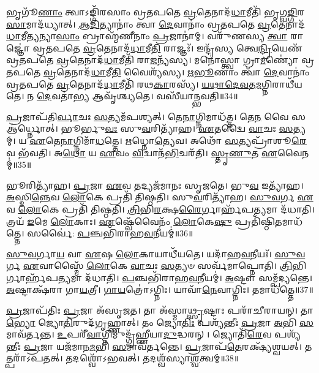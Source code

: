 𑌭𑍃𑌗𑍂᳴\-\ul{𑌣𑌾𑌂} 𑌤𑍍𑌵𑌾\-𑌽𑌙𑍍𑌗𑌿᳴𑌰𑌸𑌾𑌂 𑌵𑍍𑌰𑌤𑌪𑌤𑍇 \ul{𑌵𑍍𑌰}\-𑌤𑍇𑌨𑌾𑌦᳴\-\ul{𑌧𑌾}\-𑌮𑍀𑌤𑌿᳴ 𑌭𑍃𑌗𑍍𑌵\-\ul{𑌙𑍍𑌗𑌿}\-𑌰\-\ul{𑌸𑌾}\-\-𑌮𑌾𑌦᳴𑌧𑍍𑌯𑌾𑌤𑍍।
\-\ul{𑌆}\-\-\ul{𑌦𑌿}\-𑌤𑍍𑌯𑌾𑌨𑌾𑌂॑ 𑌤𑍍𑌵𑌾 \ul{𑌦𑍇}\-𑌵𑌾𑌨𑌾𑌂॑ 𑌵𑍍𑌰𑌤𑌪𑌤𑍇 \ul{𑌵𑍍𑌰}\-𑌤𑍇𑌨𑌾𑌦᳴\-\ul{𑌧𑌾}\-𑌮𑍀\-\-\ul{𑌤𑍍𑌯}\-𑌨𑍍𑌯𑌾\-\ul{𑌸𑌾𑌂} 𑌬𑍍𑌰𑌾𑌹𑍍𑌮᳴𑌣𑍀𑌨𑌾𑌂 \ul{𑌪𑍍𑌰}\-𑌜𑌾𑌨𑌾॑𑌮𑍍।
𑌵𑌰𑍁᳴𑌣𑌸𑍍𑌯 \ul{𑌤𑍍𑌵𑌾} 𑌰𑌾𑌜𑍍𑌞𑍋॑ 𑌵𑍍𑌰𑌤𑌪𑌤𑍇 \ul{𑌵𑍍𑌰}\-𑌤𑍇𑌨𑌾𑌦᳴\-\ul{𑌧𑌾}\-𑌮𑍀\-\ul{𑌤𑌿} 𑌰𑌾𑌜𑍍𑌞𑌃᳴।
𑌇𑌨𑍍𑌦𑍍𑌰᳴𑌸𑍍𑌯 𑌤𑍍𑌵𑍇\-\ul{𑌨𑍍𑌦𑍍𑌰𑌿}\-𑌯𑍇𑌣᳴ 𑌵𑍍𑌰𑌤𑌪𑌤𑍇 \ul{𑌵𑍍𑌰}\-𑌤𑍇𑌨𑌾𑌦᳴\-\ul{𑌧𑌾}\-𑌮𑍀𑌤𑌿᳴ 𑌰𑌾\-\ul{𑌜}\-𑌨𑍍𑌯᳴𑌸𑍍𑌯।
𑌮𑌨𑍋॑𑌸𑍍𑌤𑍍𑌵𑌾 𑌗𑍍𑌰𑌾\-\ul{𑌮}\-𑌣𑍍𑌯𑍋॑ 𑌵𑍍𑌰𑌤𑌪𑌤𑍇 \ul{𑌵𑍍𑌰}\-𑌤𑍇𑌨𑌾𑌦᳴\-\ul{𑌧𑌾}\-𑌮𑍀\-\ul{𑌤𑌿} 𑌵𑍈𑌶𑍍𑌯᳴𑌸𑍍𑌯।
\-\ul{𑌋}\-\-\ul{𑌭𑍂}\-𑌣𑌾𑌂 𑌤𑍍𑌵𑌾᳴ \ul{𑌦𑍇}\-𑌵𑌾𑌨𑌾𑌂॑ 𑌵𑍍𑌰𑌤𑌪𑌤𑍇 \ul{𑌵𑍍𑌰}\-𑌤𑍇𑌨𑌾𑌦᳴\-\ul{𑌧𑌾}\-𑌮𑍀𑌤𑌿᳴ 𑌰𑌥\-\ul{𑌕𑌾}\-𑌰𑌸𑍍𑌯᳴।
\-\ul{𑌯}\-\-\ul{𑌥𑌾}\-\-\ul{𑌦𑍇}\-\-\ul{𑌵}\-𑌤\-\ul{𑌮}\-𑌗𑍍𑌨𑌿𑌰𑌾𑌧𑍀᳴𑌯𑌤𑍇।
𑌨 \ul{𑌦𑍇}\-𑌵𑌤𑌾॑\-\ul{𑌭𑍍𑌯} 𑌆𑌵𑍃᳴𑌶𑍍𑌚𑍍𑌯𑌤𑍇।
𑌵𑌸𑍀᳴𑌯𑌾𑌨𑍍𑌭𑌵𑌤𑌿॥34॥\anuvakamend[\-\ul{𑌧𑍍𑌯𑌾}\-\-\ul{𑌯}\-\-\ul{𑌤𑌿} 𑌵𑍈 𑌰𑌾\-\ul{𑌤𑍍𑌰𑌿}\-𑌶𑍍𑌚𑌾𑌵᳴ 𑌰𑍁𑌨𑍍𑌧𑍇 𑌭𑌵𑌿\-\ul{𑌷𑍍𑌯}\-𑌨𑍍𑌤𑍀𑌤𑍍𑌯᳴𑌬𑍍𑌰𑌵𑍀𑌜𑍍𑌜\-\ul{𑌨𑌿}\-𑌷𑍍𑌯𑌸𑍇᳴\-𑌽𑌜\-\ul{𑌯}\-𑌦𑍍𑌵𑌸𑍀᳴𑌯𑌾𑌨𑍍𑌭𑌵\-\ul{𑌤𑌿} 𑌨𑌵᳴ 𑌚]

\-\ul{𑌪𑍍𑌰}\-𑌜𑌾𑌪᳴𑌤𑌿\-\ul{𑌰𑍍𑌵𑌾}\-𑌚𑌃 \ul{𑌸}\-𑌤𑍍𑌯𑌮᳴𑌪𑌶𑍍𑌯𑌤𑍍।
𑌤𑍇\-\ul{𑌨𑌾}\-𑌗𑍍𑌨𑌿𑌮𑌾𑌧᳴𑌤𑍍𑌤।
𑌤𑍇\-\ul{𑌨} 𑌵𑍈 𑌸 𑌆॑𑌰𑍍𑌧𑍍𑌨𑍋𑌤𑍍।
𑌭𑍂𑌰𑍍𑌭𑍁\-\ul{𑌵𑌃} 𑌸𑍁\-\ul{𑌵}\-𑌰𑌿𑌤𑍍𑌯𑌾᳴𑌹।
\-\ul{𑌏}\-𑌤𑌦𑍍𑌵𑍈 \ul{𑌵𑌾}\-𑌚𑌃 \ul{𑌸}\-𑌤𑍍𑌯𑌮𑍍।
𑌯 \ul{𑌏}\-𑌤𑍇\-\ul{𑌨𑌾}\-𑌗𑍍𑌨𑌿𑌮𑌾᳴\-\ul{𑌧}\-𑌤𑍍𑌤𑍇।
\-\ul{𑌋}\-𑌧𑍍𑌨𑍋\-\ul{𑌤𑍍𑌯𑍇}\-𑌵।
𑌅𑌥𑍋᳴ \ul{𑌸}\-𑌤𑍍𑌯𑌪𑍍𑌰𑌾᳴𑌶𑍂\-\ul{𑌰𑍇}\-𑌵 𑌭᳴𑌵𑌤𑌿।
𑌅\-\ul{𑌥𑍋} 𑌯 \ul{𑌏}\-𑌵𑌂 \ul{𑌵𑌿}\-𑌦𑍍𑌵𑌾𑌨᳴\-\ul{𑌭𑌿}\-𑌚𑌰᳴𑌤𑌿।
\-\ul{𑌸𑍍𑌤𑍃}\-\-\ul{𑌣𑍁}\-𑌤 \ul{𑌏}\-𑌵𑍈𑌨𑌮𑍍॑॥35॥

𑌭𑍂𑌰𑌿𑌤𑍍𑌯𑌾᳴𑌹।
\-\ul{𑌪𑍍𑌰}\-𑌜𑌾 \ul{𑌏}\-𑌵 𑌤𑌦𑍍𑌯𑌜᳴𑌮𑌾𑌨𑌃 𑌸𑍃𑌜𑌤𑍇।
𑌭𑍁\-\ul{𑌵} 𑌇𑌤𑍍𑌯𑌾᳴𑌹।
\-\ul{𑌅}\-𑌸𑍍𑌮𑌿\-\ul{𑌨𑍍𑌨𑍇}\-𑌵 \ul{𑌲𑍋}\-𑌕𑍇 𑌪𑍍𑌰𑌤𑌿᳴ 𑌤𑌿𑌷𑍍𑌠𑌤𑌿।
𑌸𑍁\-\ul{𑌵}\-𑌰𑌿𑌤𑍍𑌯𑌾᳴𑌹।
\-\ul{𑌸𑍁}\-\-\ul{𑌵}\-𑌰𑍍𑌗 \ul{𑌏}\-𑌵 \ul{𑌲𑍋}\-𑌕𑍇 𑌪𑍍𑌰𑌤𑌿᳴ 𑌤𑌿𑌷𑍍𑌠𑌤𑌿।
\-\ul{𑌤𑍍𑌰𑌿}\-𑌭𑌿\-\ul{𑌰}\-𑌕𑍍𑌷\-\ul{𑌰𑍈}\-𑌰𑍍𑌗𑌾𑌰𑍍\mbox{}𑌹᳴𑌪\-\ul{𑌤𑍍𑌯}\-𑌮𑌾 𑌦᳴𑌧𑌾𑌤𑌿।
𑌤𑍍𑌰𑌯᳴ \ul{𑌇}\-𑌮𑍇 \ul{𑌲𑍋}\-𑌕𑌾𑌃।
\-\ul{𑌏}\-𑌷𑍍𑌵𑍇᳴𑌵𑍈𑌨𑌂᳴ \ul{𑌲𑍋}\-𑌕𑍇\-\ul{𑌷𑍁} 𑌪𑍍𑌰𑌤𑌿᳴\-𑌷𑍍𑌠𑌿\-\ul{𑌤}\-𑌮𑌾𑌧᳴𑌤𑍍𑌤𑍇।
𑌸𑌰𑍍𑌵𑍈॑: \ul{𑌪}\-𑌞𑍍𑌚𑌭𑌿᳴𑌰𑌾𑌹\-\ul{𑌵}\-𑌨𑍀𑌯𑌮𑍍॑॥36॥

\-\ul{𑌸𑍁}\-\-\ul{𑌵}\-𑌰𑍍𑌗𑌾\-\ul{𑌯} 𑌵𑌾 \ul{𑌏}\-𑌷 \ul{𑌲𑍋}\-𑌕𑌾𑌯𑌾𑌧𑍀᳴𑌯𑌤𑍇।
𑌯𑌦𑌾᳴𑌹\-\ul{𑌵}\-𑌨𑍀𑌯𑌃᳴।
\-\ul{𑌸𑍁}\-\-\ul{𑌵}\-𑌰𑍍𑌗 \ul{𑌏}\-𑌵𑌾𑌸𑍍𑌮𑍈᳴ \ul{𑌲𑍋}\-𑌕𑍇 \ul{𑌵𑌾}\-𑌚𑌃 \ul{𑌸}\-𑌤𑍍𑌯𑍞 𑌸𑌰𑍍𑌵᳴𑌮𑌾𑌪𑍍𑌨𑍋𑌤𑌿।
\-\ul{𑌤𑍍𑌰𑌿}\-𑌭𑌿𑌰𑍍𑌗𑌾𑌰𑍍\mbox{}𑌹᳴𑌪\-\ul{𑌤𑍍𑌯}\-𑌮𑌾 𑌦᳴𑌧𑌾𑌤𑌿।
\-\ul{𑌪}\-𑌞𑍍𑌚𑌭𑌿᳴𑌰𑌾𑌹\-\ul{𑌵}\-𑌨𑍀𑌯𑌮𑍍॑।
\-\ul{𑌅}\-𑌷𑍍𑌟𑍗 𑌸𑌮𑍍𑌪᳴𑌦𑍍𑌯𑌨𑍍𑌤𑍇।
\-\ul{𑌅}\-𑌷𑍍𑌟𑌾𑌕𑍍𑌷᳴𑌰𑌾 𑌗𑌾\-\ul{𑌯}\-𑌤𑍍𑌰𑍀।
\-\ul{𑌗𑌾}\-\-\ul{𑌯}\-𑌤𑍍𑌰𑍋॑\-𑌽𑌗𑍍𑌨𑌿𑌃।
𑌯𑌾𑌵𑌾᳴\-\ul{𑌨𑍇}\-𑌵𑌾𑌗𑍍𑌨𑌿𑌃।
𑌤𑌮𑌾𑌧᳴𑌤𑍍𑌤𑍇॥37॥

\-\ul{𑌪𑍍𑌰}\-𑌜𑌾\-𑌪᳴𑌤𑌿𑌃 \ul{𑌪𑍍𑌰}\-𑌜𑌾 𑌅᳴\-𑌸𑍃𑌜𑌤।
𑌤𑌾 𑌅᳴𑌸𑍍𑌮𑌾\-\ul{𑌥𑍍𑌸𑍃}\-𑌷𑍍𑌟𑌾𑌃 𑌪𑌰𑌾᳴𑌚𑍀𑌰𑌾𑌯𑌨𑍍।
𑌤𑌾\-\ul{𑌭𑍍𑌯𑍋} 𑌜𑍍𑌯𑍋\-\ul{𑌤𑌿}\-𑌰𑍁𑌦᳴𑌗𑍃𑌹𑍍𑌣𑌾𑌤𑍍।
𑌤𑌂 𑌜𑍍𑌯𑍋\-\ul{𑌤𑌿𑌃} 𑌪𑌶𑍍𑌯᳴𑌨𑍍𑌤𑍀𑌃 \ul{𑌪𑍍𑌰}\-𑌜𑌾 \ul{𑌅}\-𑌭𑌿 \ul{𑌸}\-𑌮𑌾𑌵᳴𑌰𑍍𑌤𑌨𑍍𑌤।
\-\ul{𑌉}\-𑌪𑌰𑍀᳴\-\ul{𑌵𑌾}\-𑌗𑍍𑌨𑌿𑌮𑍁𑌦𑍍𑌗𑍃᳴𑌹𑍍𑌣𑍀𑌯𑌾\-\ul{𑌦𑍁}\-𑌦𑍍𑌧𑌰𑌨𑍍।
𑌜𑍍𑌯𑍋𑌤𑌿᳴\-\ul{𑌰𑍇}\-𑌵 𑌪𑌶𑍍𑌯᳴𑌨𑍍𑌤𑍀𑌃 \ul{𑌪𑍍𑌰}\-𑌜𑌾 𑌯𑌜᳴𑌮𑌾𑌨\-\ul{𑌮}\-𑌭𑌿 \ul{𑌸}\-𑌮𑌾𑌵᳴𑌰𑍍𑌤𑌨𑍍𑌤𑍇।
\-\ul{𑌪𑍍𑌰}\-𑌜𑌾𑌪᳴\-\ul{𑌤𑍇}\-𑌰𑌕𑍍𑌷𑍍𑌯᳴𑌶𑍍𑌵𑌯𑌤𑍍।
𑌤𑌤𑍍𑌪𑌰𑌾᳴\-𑌽𑌪𑌤𑌤𑍍।
𑌤𑌦𑌶𑍍𑌵𑍋᳴\-𑌽𑌭𑌵𑌤𑍍।
𑌤𑌦𑌶𑍍𑌵᳴𑌸𑍍𑌯𑌾\-\ul{𑌶𑍍𑌵}\-𑌤𑍍𑌵𑌮𑍍॥38॥

